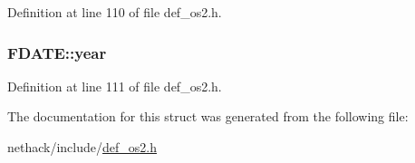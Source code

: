 Definition at line 110 of file def\+\_\+os2.\+h.

\hypertarget{structFDATE_a832478adab77f17cb5c12bd5c8b5370b}{
\subsubsection[{year}]{ F\+D\+A\+T\+E\+::year}}\label{structFDATE_a832478adab77f17cb5c12bd5c8b5370b}


Definition at line 111 of file def\+\_\+os2.\+h.



The documentation for this struct was generated from the following file\+:\begin{DoxyCompactItemize}
\item 
nethack/include/\hyperlink{def__os2_8h}{def\+\_\+os2.\+h}\end{DoxyCompactItemize}
